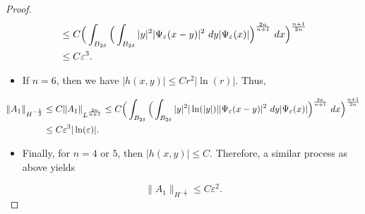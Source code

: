 \documentclass[11pt]{article}
\begin{document}
{\begin{proof}
\begin{align}
&\leq C\Big(\int_{B_{2\delta}}\Big(\int_{B_{2\delta}}|y|^{2}|\Psi_{\varepsilon}(x-y)|^{2}\ dy |\Psi_{\varepsilon}(x)|\Big)^{\frac{2n}{n+1}}\ dx\Big)^{\frac{n+1}{2n}} \notag\\
&\leq  C \varepsilon^{3}.\notag
\end{align}
\begin{itemize}
\item If $n=6$, then we have $|h(x,y)|\leq Cr^{2}|\ln(r)|$. Thus,
\end{itemize}
\begin{align}
\|A_{1}\|_{H^{-\frac{1}{2}}}&\leq C\|A_{1}\|_{L^{\frac{2n}{n+1}}}\leq C\Big(\int_{B_{2\delta}}\Big(\int_{B_{2\delta}}|y|^{2}|\ln(|y|)||\Psi_{\varepsilon}(x-y)|^{2}\ dy |\Psi_{\varepsilon}(x)|\Big)^{\frac{2n}{n+1}}\ dx\Big)^{\frac{n+1}{2n}} \notag\\
&\leq  C \varepsilon^{3}|\ln(\varepsilon)|.\notag
\end{align}

\begin{itemize}
\item Finally, for $n=4$ or $5$, then $|h(x,y)|\leq C$. Therefore, a similar process as above yields 
\end{itemize}
$$\|A_{1}\|_{H^{-\frac{1}{2}}}\leq C \varepsilon^{2}.$$




\end{proof}}
\end{document}
